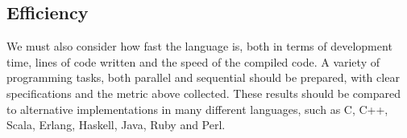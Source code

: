 \documentclass[11pt,a4paper]{report}
\begin{document}
\subsection{Efficiency}

We must also consider how fast the language is, both in terms of development time, lines of code written and the speed of the compiled code.
A variety of programming tasks, both parallel and sequential should be prepared, with clear specifications and the metric above collected.
These results should be compared to alternative implementations in many different languages, such as C, C++, Scala, Erlang, Haskell, Java, Ruby and Perl.



\end{document}
